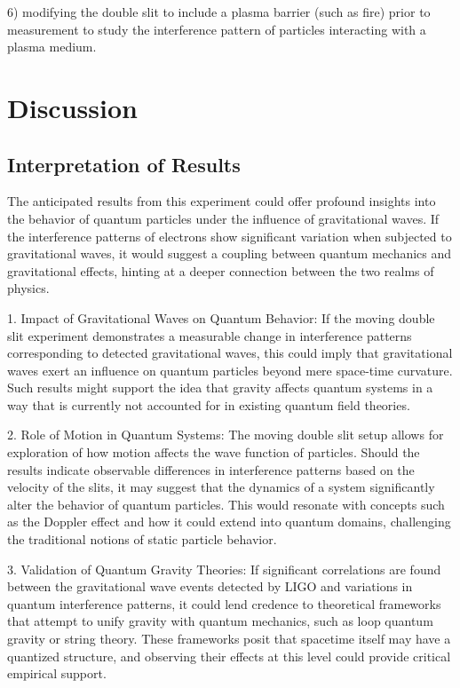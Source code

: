 \documentclass{article}
\begin{document}
6) modifying the double slit to include a plasma barrier (such as fire) prior to measurement to study the interference pattern of particles interacting with a plasma medium.

\section{Discussion}

\subsection{Interpretation of Results}
The anticipated results from this experiment could offer profound insights into the behavior of quantum particles under the influence of gravitational waves. If the interference patterns of electrons show significant variation when subjected to gravitational waves, it would suggest a coupling between quantum mechanics and gravitational effects, hinting at a deeper connection between the two realms of physics.

1. Impact of Gravitational Waves on Quantum Behavior: If the moving double slit experiment demonstrates a measurable change in interference patterns corresponding to detected gravitational waves, this could imply that gravitational waves exert an influence on quantum particles beyond mere space-time curvature. Such results might support the idea that gravity affects quantum systems in a way that is currently not accounted for in existing quantum field theories.

2. Role of Motion in Quantum Systems: The moving double slit setup allows for exploration of how motion affects the wave function of particles. Should the results indicate observable differences in interference patterns based on the velocity of the slits, it may suggest that the dynamics of a system significantly alter the behavior of quantum particles. This would resonate with concepts such as the Doppler effect and how it could extend into quantum domains, challenging the traditional notions of static particle behavior.

3. Validation of Quantum Gravity Theories: If significant correlations are found between the gravitational wave events detected by LIGO and variations in quantum interference patterns, it could lend credence to theoretical frameworks that attempt to unify gravity with quantum mechanics, such as loop quantum gravity or string theory. These frameworks posit that spacetime itself may have a quantized structure, and observing their effects at this level could provide critical empirical support.
\end{document}
